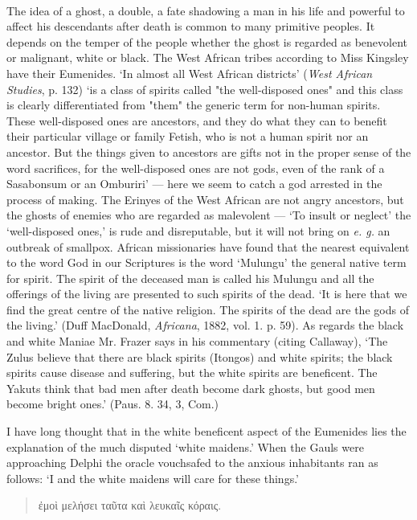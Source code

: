 \documentclass[a4paper, 11pt, oneside, polutonikogreek, english]{article}
\begin{document}
\paragraph{}
The idea of a ghost, a double, a fate shadowing a man in his life and powerful to affect his descendants after death is common to many primitive peoples. It depends on the temper of the people whether the ghost is regarded as benevolent or malignant, white or black. The West African tribes according to Miss Kingsley have their Eumenides. `In almost all West African districts' (\emph{West African Studies}, p. 132) `is a class of spirits called "the well-disposed ones" and this class is clearly differentiated from "them" the generic term for non-human spirits. These well-disposed ones are ancestors, and they do what they can to benefit their particular village or family Fetish, who is not a human spirit nor an ancestor. But the things given to ancestors are gifts not in the proper sense of the word sacrifices, for the well-disposed ones are not gods, even of the rank of a Sasabonsum or an Omburiri' --- here we seem to catch a god arrested in the process of making. The Erinyes of the West African are not angry ancestors, but the ghosts of enemies who are regarded as malevolent --- `To insult or neglect' the `well-disposed ones,' is rude and disreputable, but it will not bring on \emph{e. g.} an outbreak of smallpox. African missionaries have found that the nearest equivalent to the word God in our Scriptures is the word `Mulungu' the general native term for spirit. The spirit of the deceased man is called his Mulungu and all the offerings of the living are presented to such spirits of the dead. `It is here that we find the great centre of the native religion. The spirits of the dead are the gods of the living.' (Duff MacDonald, \emph{Africana}, 1882, vol. 1. p. 59). As regards the black and white Maniae Mr. Frazer says in his commentary (citing Callaway), `The Zulus believe that there are black spirits (Itongos) and white spirits; the black spirits cause disease and suffering, but the white spirits are beneficent. The Yakuts think that bad men after death become dark ghosts, but good men become bright ones.' (Paus. 8. 34, 3, Com.)

I have long thought that in the white beneficent aspect of the Eumenides lies the explanation of the much disputed `white maidens.' When the Gauls were approaching Delphi the oracle vouchsafed to the anxious inhabitants ran as follows: `I and the white maidens will care for these things.'
\begin{quotation}
ἐμοὶ μελήσει ταῦτα καὶ λευκαῖς κόραις.
\end{quotation}
\end{document}
